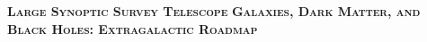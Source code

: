 \documentclass[11pt,headsepline,cleardoubleempty,twoside,openright]{scrbook}
\begin{document}
\begin{titlepage}
\begin{center}

\vspace*{20mm}

{\Huge\bfseries\scshape Large Synoptic Survey Telescope} 
\linebreak 
\linebreak 
{\Huge\bfseries\scshape Galaxies, Dark Matter, and Black Holes: Extragalactic Roadmap} 

\vspace*{20mm}




\vspace*{5mm}


\end{center}
\end{titlepage}




\tableofcontents











%









%
\end{document}
